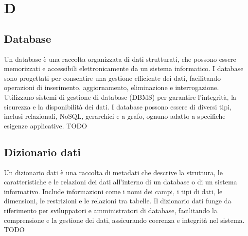 \section{D}

\vspace{2em}
\subsection*{Database}
Un database è una raccolta organizzata di dati strutturati, che possono essere memorizzati e accessibili elettronicamente da un sistema informatico. I database sono progettati per consentire una gestione efficiente dei dati, facilitando operazioni di inserimento, aggiornamento, eliminazione e interrogazione. Utilizzano sistemi di gestione di database (DBMS) per garantire l'integrità, la sicurezza e la disponibilità dei dati. I database possono essere di diversi tipi, inclusi relazionali, NoSQL, gerarchici e a grafo, ognuno adatto a specifiche esigenze applicative.
TODO

\vspace{2em}
\subsection*{Dizionario dati}
Un dizionario dati è una raccolta di metadati che descrive la struttura, le caratteristiche e le relazioni dei dati all'interno di un database o di un sistema informativo. Include informazioni come i nomi dei campi, i tipi di dati, le dimensioni, le restrizioni e le relazioni tra tabelle. Il dizionario dati funge da riferimento per sviluppatori e amministratori di database, facilitando la comprensione e la gestione dei dati, assicurando coerenza e integrità nel sistema.
TODO
